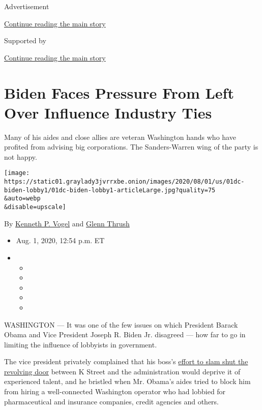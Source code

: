 Advertisement

\protect\hyperlink{after-top}{Continue reading the main story}

Supported by

\protect\hyperlink{after-sponsor}{Continue reading the main story}

\hypertarget{biden-faces-pressure-from-left-over-influence-industry-ties}{%
\section{Biden Faces Pressure From Left Over Influence Industry
Ties}\label{biden-faces-pressure-from-left-over-influence-industry-ties}}

Many of his aides and close allies are veteran Washington hands who have
profited from advising big corporations. The Sanders-Warren wing of the
party is not happy.

\texttt{[image: https://static01.graylady3jvrrxbe.onion/images/2020/08/01/us/01dc-biden-lobby1/01dc-biden-lobby1-articleLarge.jpg?quality=75\\\&auto=webp\\\&disable=upscale]}

By \href{https://www.nytimes3xbfgragh.onion/by/kenneth-p-vogel}{Kenneth
P. Vogel} and
\href{https://www.nytimes3xbfgragh.onion/by/glenn-thrush}{Glenn Thrush}

\begin{itemize}
\item
  Aug. 1, 2020, 12:54 p.m. ET
\item
  \begin{itemize}
  \item
  \item
  \item
  \item
  \item
  \end{itemize}
\end{itemize}

WASHINGTON --- It was one of the few issues on which President Barack
Obama and Vice President Joseph R. Biden Jr. disagreed --- how far to go
in limiting the influence of lobbyists in government.

The vice president privately complained that his boss's
\href{https://www.nytimes3xbfgragh.onion/2009/01/22/us/politics/22obama.html}{effort
to slam shut the revolving door} between K Street and the administration
would deprive it of experienced talent, and he bristled when Mr. Obama's
aides tried to block him from hiring a well-connected Washington
operator who had lobbied for pharmaceutical and insurance companies,
credit agencies and others.

